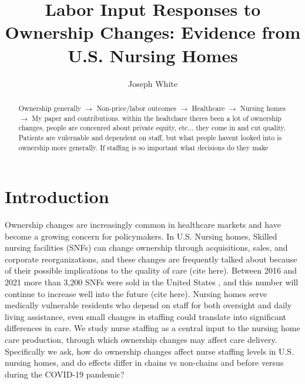 \documentclass[preprint,authoryear]{elsarticle}
\begin{document}
\begin{frontmatter}
\title{Labor Input Responses to Ownership Changes: Evidence from U.S. Nursing Homes}
\author[miami]{Joseph White}


\address[miami]{Miami University, Oxford, OH, USA}


\begin{abstract}

Ownership generally $\rightarrow$ Non-price/labor outcomes $\rightarrow$ Healthcare $\rightarrow$ Nursing homes $\rightarrow$ My paper and contributions. within the healtchare theres been a lot of ownership changes, people are concenred about private equity, etc... they come in and cut quality. Patients are vulernable and dependent on staff, but what people havent looked into is ownership more generally. If staffing is so important what decisions do they make 

\end{abstract}

\end{frontmatter}

\section{Introduction}


Ownership changes are increasingly common in healthcare markets and have become a growing concern for policymakers. In U.S. Nursing homes, Skilled nursing facilities (SNFs) can change ownership through acquisitions, sales, and corporate reorganizations, and these changes are frequently talked about because of their possible implications to the quality of care (cite here). Between 2016 and 2021 more than 3,200 SNFs were sold in the United States \citep{prusynski_humbert_mroz_2023}, and this number will continue to increase well into the future (cite here). Nursing homes serve medically vulnerable residents who depend on staff for both oversight and daily living assistance, even small changes in staffing could translate into significant differences in care. We study nurse staffing as a central input to the nursing home care production, through which ownership changes may affect care delivery. Specifically we ask, how do ownership changes affect nurse staffing levels in U.S. nursing homes, and do effects differ in chains vs non-chains and before versus during the COVID-19 pandemic?
\end{document}
